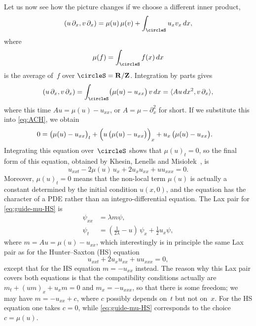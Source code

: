 \documentclass[10pt,a4paper]{article} \pdfoutput=1 
\begin{document}
Let us now see how the picture changes if we choose a different inner product,
\begin{equation*}
  (u \, \partial_x , v \, \partial_x) = \mu(u) \, \mu(v) + \int_{\circleS} u_xv_x \, dx
  ,
\end{equation*}
where
\begin{equation*}
  \mu(f)=\int_{\circleS} f(x) \, dx
\end{equation*}
is the average of~$f$ over $\circleS =  \mathbf{R}/\mathbf{Z}$.
Integration by parts gives
\begin{equation*}
  (u \, \partial_x , v \, \partial_x)
  = \int_{\circleS} \bigl( \mu(u) - u_{xx} \bigr) \, v \, dx
  = \langle Au \, dx^2 , v \, \partial_x \rangle
  ,
\end{equation*}
where this time $Au = \mu(u) - u_{xx}$,
or $A = \mu - \partial_x^2$ for short.
If we substitute this into \eqref{eq:ACH}, we obtain
\begin{equation*}
  \begin{split}
    0 &
    = \bigl( \mu(u) - u_{xx} \bigr)_t
    + \Bigl( u \, \bigl( \mu(u) - u_{xx} \bigr) \Bigr)_x
    + u_x \, \bigl( \mu(u) - u_{xx} \bigr)
    .
  \end{split}
\end{equation*}
Integrating this equation over~$\circleS$ shows that $\mu(u)_t = 0$,
so the final form of this equation,
obtained by Khesin, Lenells and
Misiołek~\cite{khesin-lenells-misiolek:2008:generalized-HS-circle-diffeomorphisms}, is
\begin{equation}
  \label{eq:guide-mu-HS}
  u_{xxt} - 2 \mu(u) \, u_x + 2 u_x u_{xx} + u u_{xxx} = 0
  .
\end{equation}
Moreover, $\mu(u)_t = 0$ means that the non-local term $\mu(u)$ is actually a constant determined
by the initial condition $u(x,0)$,
and the equation has the character of a PDE rather than an integro-differential equation.
The Lax pair for \eqref{eq:guide-mu-HS} is
\begin{align*}
  \psi_{xx} &=\lambda m \psi
  , \\
  \psi_t &= \left( \tfrac{1}{2\lambda} - u \right) \, \psi_x + \tfrac12 u_x \psi
  ,
\end{align*}
where $m = Au = \mu(u) - u_{xx}$,
which interestingly is in principle the same Lax pair as for the Hunter--Saxton (HS)
equation~\cite{hunter-saxton:1991:dynamics-of-director-fields,
  hunter-zheng:1994:completely-integrable-hyperbolic-variational-equation}
\begin{equation*}
  u_{xxt} + 2 u_x u_{xx} + u u_{xxx} = 0
  ,
\end{equation*}
except that for the HS equation $m = -u_{xx}$ instead.
The reason why this Lax pair covers both equations is that the
compatibility conditions actually are
$m_t + (um)_x + u_xm = 0$ and $m_x = -u_{xxx}$,
so that there is some freedom; we may have $m = -u_{xx} + c$,
where $c$ possibly depends on~$t$ but not on~$x$.
For the HS equation one takes $c=0$, while \eqref{eq:guide-mu-HS} corresponds to the choice $c=\mu(u)$.
\end{document}
